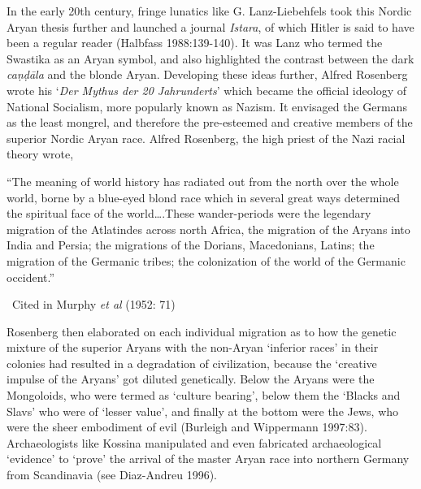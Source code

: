 In the early 20th century, fringe lunatics like G. Lanz-Liebehfels took this Nordic Aryan thesis further and launched a journal \textit{Istara}, of which Hitler is said to have been a regular reader (Halbfass 1988:139-140). It was Lanz who termed the Swastika as an Aryan symbol, and also highlighted the contrast between the dark \textit{caṇḍāla} and the blonde Aryan. Developing these ideas further, Alfred Rosenberg wrote his ‘\textit{Der Mythus der 20 Jahrunderts}’ which became the official ideology of National Socialism, more popularly known as Nazism. It envisaged the Germans as the least mongrel, and therefore the pre-esteemed and creative members of the superior Nordic Aryan race. Alfred Rosenberg, the high priest of the Nazi racial theory wrote,

\begin{myquote}
“The meaning of world history has radiated out from the north over the whole world, borne by a blue-eyed blond race which in several great ways determined the spiritual face of the world….These wander-periods were the legendary migration of the Atlatindes across north Africa, the migration of the Aryans into India and Persia; the migrations of the Dorians, Macedonians, Latins; the migration of the Germanic tribes; the colonization of the world of the Germanic occident.” 

~\hfill Cited in Murphy \textit{et al }(1952: 71)
\end{myquote}

Rosenberg then elaborated on each individual migration as to how the genetic mixture of the superior Aryans with the non-Aryan ‘inferior races’ in their colonies had resulted in a degradation of civilization, because the ‘creative impulse of the Aryans’ got diluted genetically. Below the Aryans were the Mongoloids, who were termed as ‘culture bearing’, below them the ‘Blacks and Slavs’ who were of ‘lesser value’, and finally at the bottom were the Jews, who were the sheer embodiment of evil (Burleigh and Wippermann 1997:83). Archaeologists like Kossina manipulated and even fabricated archaeological ‘evidence’ to ‘prove’ the arrival of the master Aryan race into northern Germany from Scandinavia (see Diaz-Andreu 1996).

